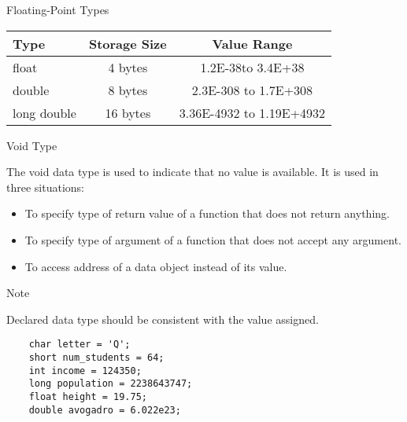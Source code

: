 \documentclass[compress]{beamer}
\begin{document}
\begin{slide}
	\begin{block}{Floating-Point Types}

	\begin{table}
	\begin{tabular}{lcc}
	\toprule
	Type & Storage Size & Value Range \\
	\midrule
	float & 4 bytes & 1.2E-38to 3.4E+38 \\
	double & 8 bytes & 2.3E-308 to 1.7E+308 \\
	long double & 16 bytes & 3.36E-4932 to 1.19E+4932 \\
	\bottomrule
	\end{tabular}
	\end{table}

	\end{block}
\end{slide}

\begin{slide}
	\begin{block}{Void Type}

	The \alert{void} data type is used to indicate that no value is available.
	It is used in three situations:

	\begin{itemize}
	\item[] To specify type of return value of a function that does not return anything.
	\item[] To specify type of argument of a function that does not accept any argument.
	\item[] To access address of a data object instead of its value.
	\end{itemize}

	\end{block}
\end{slide}

\begin{slide}
	\begin{block}{Note}

	Declared data type should be consistent with the value assigned.

	\begin{verbatim}
	char letter = 'Q';
	short num_students = 64;
	int income = 124350;
	long population = 2238643747;
	float height = 19.75;
	double avogadro = 6.022e23;
	\end{verbatim}

	\end{block}
\end{slide}
\end{document}
